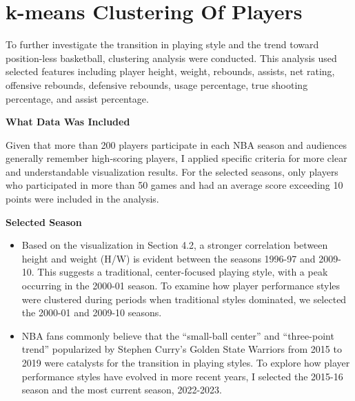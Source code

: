 \documentclass[
]{book}
\begin{document}
\hypertarget{k-means-clustering-of-players}{%
\section{k-means Clustering Of Players}\label{k-means-clustering-of-players}}

To further investigate the transition in playing style and the trend toward position-less basketball, clustering analysis were conducted. This analysis used selected features including player height, weight, rebounds, assists, net rating, offensive rebounds, defensive rebounds, usage percentage, true shooting percentage, and assist percentage.

\textbf{What Data Was Included}

Given that more than 200 players participate in each NBA season and audiences generally remember high-scoring players, I applied specific criteria for more clear and understandable visualization results. For the selected seasons, only players who participated in more than 50 games and had an average score exceeding 10 points were included in the analysis.

\textbf{Selected Season}

\begin{itemize}
\item
  Based on the visualization in Section 4.2, a stronger correlation between height and weight (H/W) is evident between the seasons 1996-97 and 2009-10. This suggests a traditional, center-focused playing style, with a peak occurring in the 2000-01 season. To examine how player performance styles were clustered during periods when traditional styles dominated, we selected the 2000-01 and 2009-10 seasons.
\item
  NBA fans commonly believe that the ``small-ball center'' and ``three-point trend'' popularized by Stephen Curry's Golden State Warriors from 2015 to 2019 were catalysts for the transition in playing styles. To explore how player performance styles have evolved in more recent years, I selected the 2015-16 season and the most current season, 2022-2023.
\end{itemize}
\end{document}
